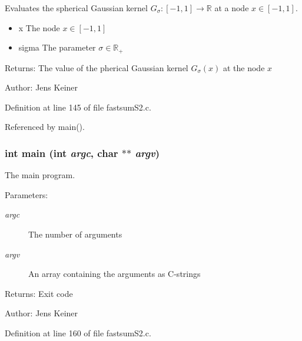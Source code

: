 Evaluates the spherical Gaussian kernel $G_\sigma: [-1,1] \rightarrow \mathbb{R}$ at a node $x \in [-1,1]$. 

\begin{itemize}
\item x The node $x \in [-1,1]$ \item sigma The parameter $\sigma \in \mathbb{R}_+$\end{itemize}
\begin{Desc}
\item[Returns:]The value of the pherical Gaussian kernel $G_\sigma(x)$ at the node $x$\end{Desc}
\begin{Desc}
\item[Author:]Jens Keiner \end{Desc}


Definition at line 145 of file fastsumS2.c.

Referenced by main().\hypertarget{group__applications__fastsumS2__test_g3c04138a5bfe5d72780bb7e82a18e627}{
\subsubsection{\setlength{\rightskip}{0pt plus 5cm}int main (int {\em argc}, char $\ast$$\ast$ {\em argv})}}
\label{group__applications__fastsumS2__test_g3c04138a5bfe5d72780bb7e82a18e627}


The main program. 

\begin{Desc}
\item[Parameters:]
\begin{description}
\item[{\em argc}]The number of arguments \item[{\em argv}]An array containing the arguments as C-strings\end{description}
\end{Desc}
\begin{Desc}
\item[Returns:]Exit code\end{Desc}
\begin{Desc}
\item[Author:]Jens Keiner \end{Desc}


Definition at line 160 of file fastsumS2.c.

